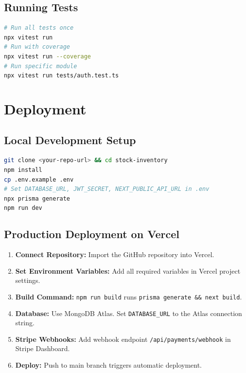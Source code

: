 ﻿\documentclass[12pt,a4paper]{report}
\begin{document}
\subsection{Running Tests}
\begin{lstlisting}[language=bash,caption={Test execution commands}]
# Run all tests once
npx vitest run
# Run with coverage
npx vitest run --coverage
# Run specific module
npx vitest run tests/auth.test.ts
\end{lstlisting}

\section{Deployment}
\subsection{Local Development Setup}
\begin{lstlisting}[language=bash,caption={Local setup}]
git clone <your-repo-url> && cd stock-inventory
npm install
cp .env.example .env
# Set DATABASE_URL, JWT_SECRET, NEXT_PUBLIC_API_URL in .env
npx prisma generate
npm run dev
\end{lstlisting}

\subsection{Production Deployment on Vercel}
\begin{enumerate}[leftmargin=1.5em]
  \item \textbf{Connect Repository:} Import the GitHub repository into Vercel.
  \item \textbf{Set Environment Variables:} Add all required variables in Vercel project settings.
  \item \textbf{Build Command:} \texttt{npm run build} runs \texttt{prisma generate \&\& next build}.
  \item \textbf{Database:} Use MongoDB Atlas. Set \texttt{DATABASE\_URL} to the Atlas connection string.
  \item \textbf{Stripe Webhooks:} Add webhook endpoint \texttt{/api/payments/webhook} in Stripe Dashboard.
  \item \textbf{Deploy:} Push to main branch triggers automatic deployment.
\end{enumerate}
\end{document}
